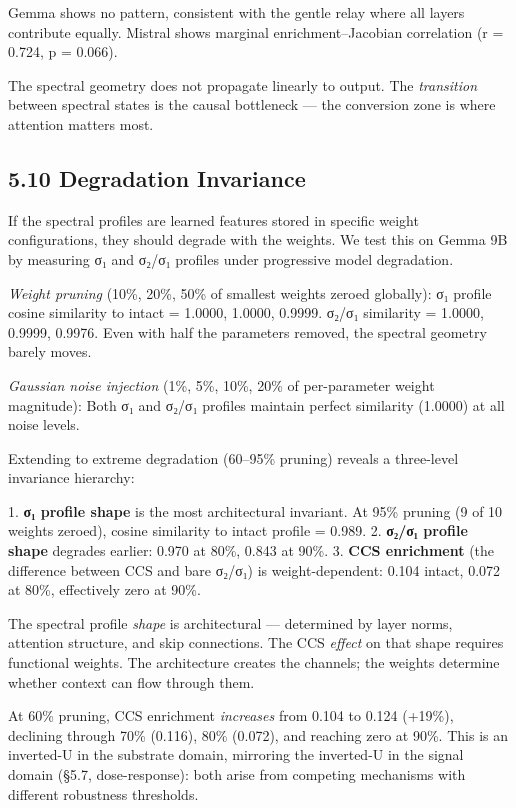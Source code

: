 \documentclass[12pt]{article}
\begin{document}
Gemma shows no pattern, consistent with the gentle relay where all layers contribute equally. Mistral shows marginal enrichment–Jacobian correlation (r = 0.724, p = 0.066).

The spectral geometry does not propagate linearly to output. The \textit{transition} between spectral states is the causal bottleneck — the conversion zone is where attention matters most.

\subsection*{5.10 Degradation Invariance}

If the spectral profiles are learned features stored in specific weight configurations, they should degrade with the weights. We test this on Gemma 9B by measuring σ₁ and σ₂/σ₁ profiles under progressive model degradation.

\textit{Weight pruning} (10\%, 20\%, 50\% of smallest weights zeroed globally): σ₁ profile cosine similarity to intact = 1.0000, 1.0000, 0.9999. σ₂/σ₁ similarity = 1.0000, 0.9999, 0.9976. Even with half the parameters removed, the spectral geometry barely moves.

\textit{Gaussian noise injection} (1\%, 5\%, 10\%, 20\% of per-parameter weight magnitude): Both σ₁ and σ₂/σ₁ profiles maintain perfect similarity (1.0000) at all noise levels.

Extending to extreme degradation (60–95\% pruning) reveals a three-level invariance hierarchy:

1. \textbf{σ₁ profile shape} is the most architectural invariant. At 95\% pruning (9 of 10 weights zeroed), cosine similarity to intact profile = 0.989.
2. \textbf{σ₂/σ₁ profile shape} degrades earlier: 0.970 at 80\%, 0.843 at 90\%.
3. \textbf{CCS enrichment} (the difference between CCS and bare σ₂/σ₁) is weight-dependent: 0.104 intact, 0.072 at 80\%, effectively zero at 90\%.

The spectral profile \textit{shape} is architectural — determined by layer norms, attention structure, and skip connections. The CCS \textit{effect} on that shape requires functional weights. The architecture creates the channels; the weights determine whether context can flow through them.

At 60\% pruning, CCS enrichment \textit{increases} from 0.104 to 0.124 (+19\%), declining through 70\% (0.116), 80\% (0.072), and reaching zero at 90\%. This is an inverted-U in the substrate domain, mirroring the inverted-U in the signal domain (§5.7, dose-response): both arise from competing mechanisms with different robustness thresholds.
\end{document}
